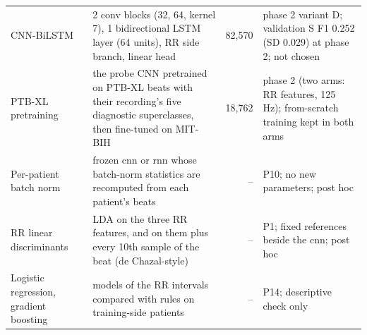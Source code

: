 \begin{longtable}{p{2.6cm}p{6.1cm}rp{4.6cm}}
CNN-BiLSTM & 2 conv blocks (32, 64, kernel 7), 1 bidirectional LSTM layer (64 units), RR side branch, linear head & 82,570 & phase 2 variant D; validation S F1 0.252 (SD 0.029) at phase 2; not chosen \\
PTB-XL pretraining & the probe CNN pretrained on PTB-XL beats with their recording's five diagnostic superclasses, then fine-tuned on MIT-BIH & 18,762 & phase 2 (two arms: RR features, 125 Hz); from-scratch training kept in both arms \\
Per-patient batch norm & frozen cnn or rnn whose batch-norm statistics are recomputed from each patient's beats & -- & P10; no new parameters; post hoc \\
RR linear discriminants & LDA on the three RR features, and on them plus every 10th sample of the beat (de Chazal-style) & -- & P1; fixed references beside the cnn; post hoc \\
Logistic regression, gradient boosting & models of the RR intervals compared with rules on training-side patients & -- & P14; descriptive check only \\
\end{longtable}
\endgroup
\begingroup\footnotesize
